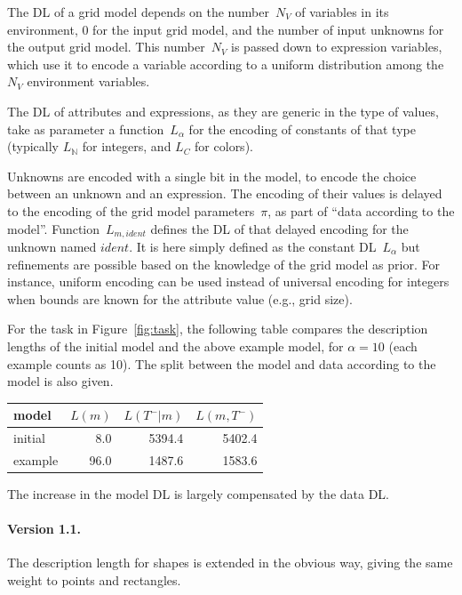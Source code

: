 \documentclass[a4paper]{llncs}
\newcommand{\nat}{\mathbb{N}}
\begin{document}
The DL of a grid model depends on the number~$N_V$ of variables in its
environment, 0 for the input grid model, and the number of input
unknowns for the output grid model. This number~$N_V$ is passed down
to expression variables, which use it to encode a variable according to a
uniform distribution among the $N_V$ environment variables.

The DL of attributes and expressions, as they are generic in the type
of values, take as parameter a function~$L_\alpha$ for the encoding of
constants of that type (typically $L_\nat$ for integers, and $L_C$ for
colors).

Unknowns are encoded with a single bit in the model, to encode the
choice between an unknown and an expression. The encoding of their
values is delayed to the encoding of the grid model parameters~$\pi$,
as part of ``data according to the model''.  Function~$L_{m,ident}$
defines the DL of that delayed encoding for the unknown named
$ident$. It is here simply defined as the constant DL~$L_\alpha$ but
refinements are possible based on the knowledge of the grid model as
prior. For instance, uniform encoding can be used instead of universal
encoding for integers when bounds are known for the attribute value
(e.g., grid size).

For the task in Figure~\ref{fig:task}, the following table compares
the description lengths of the initial model and the above example
model, for $\alpha=10$ (each example counts as 10). The split between
the model and data according to the model is also given.

\begin{center}
  \begin{tabular}{|l|r|r|r|}
    \hline
    model & $L(m)$ & $L(T^-|m)$ & $L(m,T^-)$ \\
    \hline
    initial & 8.0 & 5394.4 & 5402.4 \\
    example & 96.0 & 1487.6 & 1583.6 \\
    \hline
  \end{tabular}
\end{center}

The increase in the model DL is largely compensated by the data DL.

\paragraph{Version 1.1.} The description length for shapes is extended
in the obvious way, giving the same weight to points and rectangles.
\end{document}
